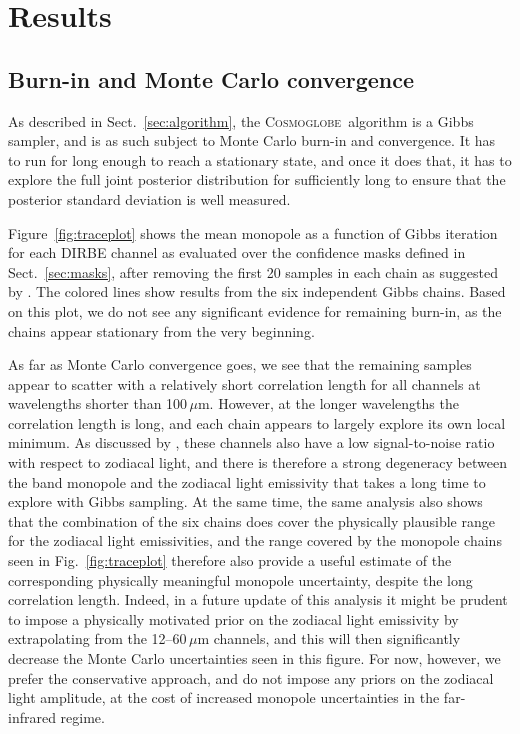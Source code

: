 \documentclass{aa}
\newcommand{\cosmoglobe}{\textsc{Cosmoglobe}}
\begin{document}
\section{Results}
\label{sec:results}

\subsection{Burn-in and Monte Carlo convergence}

As described in Sect.~\ref{sec:algorithm}, the \cosmoglobe\ algorithm is a
Gibbs sampler, and is as such subject to Monte Carlo burn-in and
convergence. It has to run for long enough to reach a stationary
state, and once it does that, it has to explore the full joint
posterior distribution for sufficiently long to ensure that the
posterior standard deviation is well measured.


Figure~\ref{fig:traceplot} shows the mean monopole as a function of
Gibbs iteration for each DIRBE channel as evaluated over the
confidence masks defined in Sect.~\ref{sec:masks}, after removing the
first 20 samples in each chain as suggested by \citet{CG02_02}. The
colored lines show results from the six independent Gibbs
chains. Based on this plot, we do not see any significant evidence for
remaining burn-in, as the chains appear stationary from the very
beginning.

As far as Monte Carlo convergence goes, we see that the remaining
samples appear to scatter with a relatively short correlation length
for all channels at wavelengths shorter than
100$\,\mu\mathrm{m}$. However, at the longer wavelengths the
correlation length is long, and each chain appears to largely explore
its own local minimum. As discussed by \citet{CG02_02}, these channels
also have a low signal-to-noise ratio with respect to zodiacal light,
and there is therefore a strong degeneracy between the band monopole
and the zodiacal light emissivity that takes a long time to explore
with Gibbs sampling. At the same time, the same analysis also shows
that the combination of the six chains does cover the physically
plausible range for the zodiacal light emissivities, and the range
covered by the monopole chains seen in Fig.~\ref{fig:traceplot}
therefore also provide a useful estimate of the corresponding
physically meaningful monopole uncertainty, despite the long
correlation length. Indeed, in a future update of this analysis it
might be prudent to impose a physically motivated prior on the
zodiacal light emissivity by extrapolating from the
12--60\,$\mu\mathrm{m}$ channels, and this will then significantly
decrease the Monte Carlo uncertainties seen in this figure. For now,
however, we prefer the conservative approach, and do not impose any
priors on the zodiacal light amplitude, at the cost of increased
monopole uncertainties in the far-infrared regime.
\end{document}
